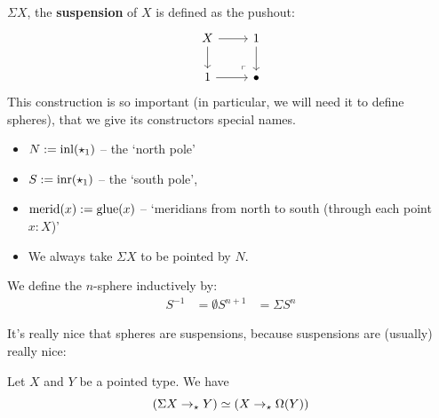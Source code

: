 \documentclass[10pt,oneside,leqno,openright]{memoir}
\begin{document}
\begin{definition}[Suspensions]
    $\Sigma X$, the \textbf{suspension} of $X$ is defined as the pushout:
      \[\begin{tikzcd}[ampersand replacement=\&]
	X \& 1 \\
	1 \& \bullet
	\arrow[from=1-1, to=1-2]
	\arrow[from=1-1, to=2-1]
	\arrow[from=1-2, to=2-2]
	\arrow[from=2-1, to=2-2]
	\arrow["\lrcorner"{anchor=center, pos=0.125, rotate=180}, draw=none, from=2-2, to=1-1]
      \end{tikzcd}\]
      This construction is so important (in particular, we will need it to define spheres), that we give its constructors special names.
      \begin{itemize}
      \item $N:= \operatorname{inl}(\star_1)$ -- the `north pole'
      \item $S:= \operatorname{inr}(\star_1)$ -- the `south pole',
      \item $\operatorname{merid}(x) := \operatorname{glue}(x)$ -- `meridians from north to south (through each point $x:X$)'
      \item We always take $\Sigma X$ to be pointed by $N$.
      \end{itemize}
\end{definition}
%
\begin{definition}
  We define the $n$-sphere inductively by:
  \begin{align*}
    S^{-1} &= \emptyset
    S^{n+1} &= \Sigma S^n
  \end{align*}
\end{definition}
%
It's really nice that spheres are suspensions, because suspensions are (usually) really nice:
\begin{proposition}
  Let $X$ and $Y$ be a pointed type. We have
  \[ (\Sigma X \to_\star Y) \simeq (X \to_\star \Omega(Y)) \]
\end{proposition}
\end{document}
